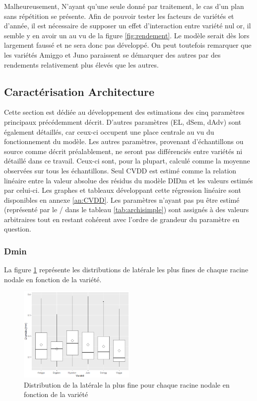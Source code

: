 Malheureusement, N'ayant qu'une seule donné par traitement, le cas d'un plan sans répétition se présente.
Afin de pouvoir tester les facteurs de variétés et d'année, il est nécessaire de supposer un effet d'interaction entre variété nul or, il semble y en avoir un au vu de la figure \ref{fig:rendement}.
Le modèle serait dès lors largement faussé et ne sera donc pas développé.
On peut toutefois remarquer que les variétés Amiggo et Juno paraissent se démarquer des autres par des rendements relativement plus élevés que les autres.
\newline

\subsection{Caractérisation Architecture}

Cette section est dédiée au développement des estimations des cinq paramètres principaux précédemment décrit.
D'autres paramètres (EL, dSem, dAdv) sont également détaillés, car ceux-ci occupent une place centrale au vu du fonctionnement du modèle.
Les autres paramètres, provenant d'échantillons ou source comme décrit préalablement, ne seront pas différenciés entre variétés ni détaillé dans ce travail.
Ceux-ci sont, pour la plupart, calculé comme la moyenne observées sur tous les échantillons.
Seul CVDD est estimé comme la relation linéaire entre la valeur absolue des résidus du modèle DIDm et les valeurs estimés par celui-ci.
Les graphes et tableaux développant cette régression linéaire sont disponibles en annexe \ref{an:CVDD}.
Les paramètres n'ayant pas pu être estimé (représenté par le / dans le tableau \ref{tab:archisimple}) sont assignés à des valeurs arbitraires tout en restant cohérent avec l'ordre de grandeur du paramètre en question.

\subsubsection{Dmin}

La figure \ref{fig:boxplot Dmin} représente les distributions de latérale les plus fines de chaque racine nodale en fonction de la variété.

\begin{figure}[ht]
\centering
\includegraphics[width=0.5\textwidth]{Image/boxplot Dmin.png}
\caption{Distribution de la latérale la plus fine pour chaque racine nodale en fonction de la variété}
\label{fig:boxplot Dmin}
\end{figure}

